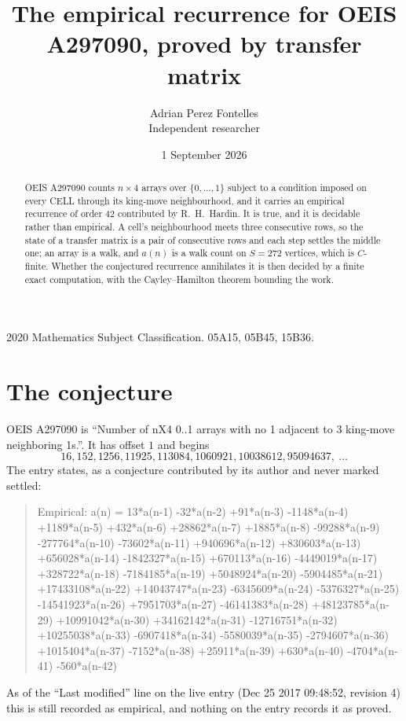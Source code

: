 \documentclass[11pt,a4paper]{article}
\title{The empirical recurrence for OEIS A297090, proved by transfer matrix}
\author{Adrian Perez Fontelles\\ \small Independent researcher}
\date{1 September 2026}
\theoremstyle{plain}
\theoremstyle{definition}
\begin{document}
\maketitle

\begin{abstract}
OEIS A297090 counts $n\times4$ arrays over $\{0,\dots,1\}$ subject to a condition imposed on
every CELL through its king-move neighbourhood, and it carries an empirical recurrence of
order $42$ contributed by R.~H.~Hardin. It is true, and it is decidable rather than
empirical. A cell's neighbourhood meets three consecutive rows, so the state of a transfer
matrix is a pair of consecutive rows and each step settles the middle one; an array is a
walk, and $a(n)$ is a walk count on $S=272$ vertices, which is $C$-finite. Whether the
conjectured recurrence annihilates it is then decided by a finite exact computation, with the
Cayley--Hamilton theorem bounding the work.
\end{abstract}

\noindent\small 2020 Mathematics Subject Classification. 05A15, 05B45, 15B36.\normalsize

\section{The conjecture}

OEIS A297090 is ``Number of nX4 0..1 arrays with no 1 adjacent to 3 king-move neighboring 1s.''. It has offset $1$ and begins
\[
16, 152, 1256, 11925, 113084, 1060921, 10038612, 95094637,\ \dots
\]
The entry states, as a conjecture contributed by its author and never marked settled:
\begin{quote}
Empirical: a(n) = 13*a(n-1) -32*a(n-2) +91*a(n-3) -1148*a(n-4) +1189*a(n-5) +432*a(n-6) +28862*a(n-7) +1885*a(n-8) -99288*a(n-9) -277764*a(n-10) -73602*a(n-11) +940696*a(n-12) +830603*a(n-13) +656028*a(n-14) -1842327*a(n-15) +670113*a(n-16) -4449019*a(n-17) +328722*a(n-18) -7184185*a(n-19) +5048924*a(n-20) -5904485*a(n-21) +17433108*a(n-22) +14043747*a(n-23) -6345609*a(n-24) -5376327*a(n-25) -14541923*a(n-26) +7951703*a(n-27) -46141383*a(n-28) +48123785*a(n-29) +10991042*a(n-30) +34162142*a(n-31) -12716751*a(n-32) +10255038*a(n-33) -6907418*a(n-34) -5580039*a(n-35) -2794607*a(n-36) +1015404*a(n-37) -7152*a(n-38) +25911*a(n-39) +630*a(n-40) -4704*a(n-41) -560*a(n-42)
\end{quote}
As of the ``Last modified'' line on the live entry (Dec 25 2017 09:48:52, revision 4) this is still
recorded as empirical, and nothing on the entry records it as proved.
\end{document}
